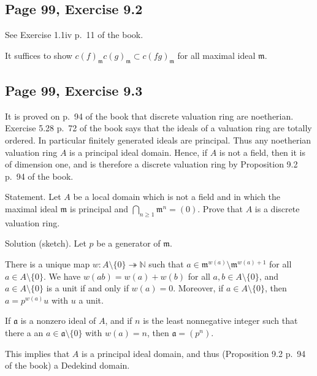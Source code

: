 \documentclass[parskip=half,fontsize=12pt]{scrartcl}%
\newcommand{\mf}{\mathfrak}
\newcommand{\aaa}{\mf a}
\newcommand{\mmm}{\mf m}
\newcommand{\epi}{\twoheadrightarrow}
\begin{document}
\subsection{Page 99, Exercise 9.2}%

See Exercise 1.1iv p.~11 of the book. 

It suffices to show $c(f)_\mmm c(g)_\mmm\subset c(fg)_\mmm$ for all maximal ideal $\mmm$. 

\subsection{Page 99, Exercise 9.3}%

It is proved on p.~94 of the book that discrete valuation ring are noetherian. Exercise 5.28 p.~72 of the book says that the ideals of a valuation ring are totally ordered. In particular finitely generated ideals are principal. Thus any noetherian valuation ring $A$ is a principal ideal domain. Hence, if $A$ is not a field, then it is of dimension one, and is therefore a discrete valuation ring by Proposition 9.2 p.~94 of the book. 

Statement. Let $A$ be a local domain which is not a field and in which the maximal ideal $\mmm$ is principal and $\bigcap_{n\ge1}\mmm^n=(0)$. Prove that $A$ is a discrete valuation ring.

Solution (sketch). Let $p$ be a generator of $\mmm$. 

There is a unique map $w:A\setminus\{0\}\epi\mathbb N$ such that $a\in\mmm^{w(a)}\setminus\mmm^{w(a)+1}$ for all $a\in A\setminus\{0\}$. We have $w(ab)=w(a)+w(b)$ for all $a,b\in A\setminus\{0\}$, and $a\in A\setminus\{0\}$ is a unit if and only if $w(a)=0$. Moreover, if $a\in A\setminus\{0\}$, then $a=p^{w(a)}u$ with  $u$ a unit.

If $\aaa$ is a nonzero ideal of $A$, and if $n$ is the least nonnegative integer such that there a an $a\in\aaa\setminus\{0\}$ with $w(a)=n$, then $\aaa=(p^n)$. 

This implies that $A$ is a principal ideal domain, and thus (Proposition 9.2 p.~94 of the book) a Dedekind domain.

\end{document}

